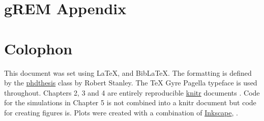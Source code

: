 
\appendix
\chapter{gREM Appendix}
\label{appendixlabel1}




\chapter{Colophon}
\label{appendixlabel3}

This document was set using \LaTeX, \XeLaTeX\vspace{1mm} and Bib\LaTeX.
The formatting is defined by the \href{https://github.com/robjstan/latex-phdthesis}{phdthesis} class by Robert Stanley.
The TeX Gyre Pagella typeface is used throughout.
Chapters 2, 3 and 4 are entirely reproducible \href{http://yihui.name/knitr/}{knitr} documents \cite{knitr}.
Code for the simulations in Chapter 5 is not combined into a knitr document but code for creating figures is.
Plots were created with a combination of \href{www.inkscape.org}{Inkscape}, \textcite{ggplot2, palettetown, ggtree}.

